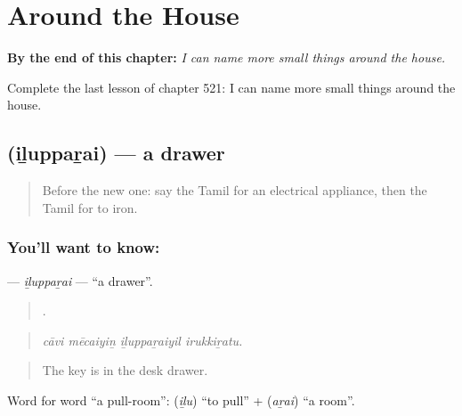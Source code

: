 
\chapter{Around the House}
\label{ch:ta-around-the-house}

\begin{chapteropening}
\textbf{By the end of this chapter:} \emph{I can name more small things around the house.}

Complete the last lesson of chapter 521: I can name more small things around the house.
\end{chapteropening}

\section[\texorpdfstring{\ta{இழுப்பறை} (iḻuppaṟai)}{இழுப்பறை (iḻuppaṟai)}]{ (iḻuppaṟai) — a drawer}

\label{lesson:TA-C521-ilupparai}



\begin{quote}
Before the new one: say the Tamil for an electrical appliance, then the Tamil for to iron.
\end{quote}

\subsection*{You'll want to know: }
\textbf{} — \emph{iḻuppaṟai} — \textquotedblleft{}a drawer\textquotedblright{}.

\begin{quote}
   .
\end{quote}

\begin{quote}
\emph{cāvi mēcaiyiṉ iḻuppaṟaiyil irukkiṟatu.}
\end{quote}

\begin{quote}
The key is in the desk drawer.
\end{quote}

Word for word \textquotedblleft{}a pull-room\textquotedblright{}:  (\emph{iḻu}) \textquotedblleft{}to pull\textquotedblright{} +  (\emph{aṟai}) \textquotedblleft{}a room\textquotedblright{}.

